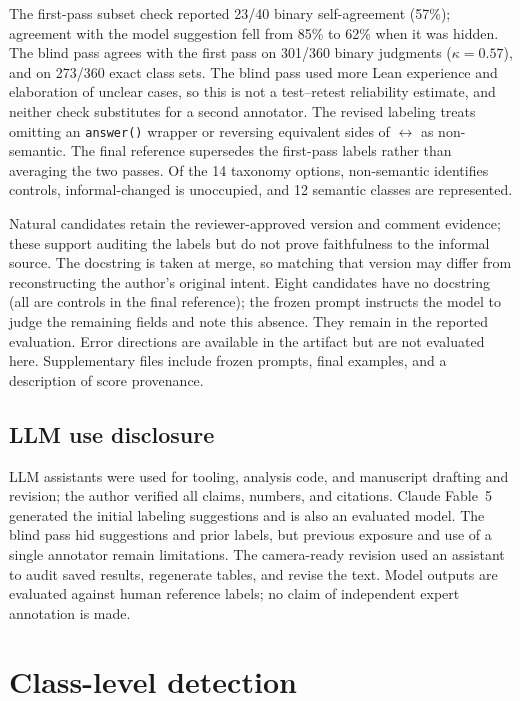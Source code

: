 \documentclass{article}
\begin{document}
The first-pass subset check reported 23/40 binary self-agreement (57\%);
agreement with the model suggestion fell from 85\% to 62\% when it was
hidden. The blind pass agrees with the first pass on 301/360 binary judgments
($\kappa=0.57$), and on 273/360 exact class sets. The blind pass used more
Lean experience and elaboration of unclear cases, so this is not a
test--retest reliability estimate, and neither check substitutes for a second
annotator. The revised labeling treats omitting an \texttt{answer()} wrapper
or reversing equivalent sides of $\leftrightarrow$ as non-semantic.
The final reference supersedes the first-pass labels rather than averaging
the two passes. Of the 14 taxonomy options, non-semantic identifies controls,
informal-changed is unoccupied, and 12 semantic classes are represented.

Natural candidates retain the reviewer-approved version and comment evidence;
these support auditing the labels but do not prove faithfulness to the
informal source. The docstring is taken at merge, so matching that version
may differ from reconstructing the author's original intent. Eight candidates have no docstring (all are controls in the final reference);
the frozen prompt instructs the model to judge the remaining fields and note
this absence. They remain in the reported evaluation. Error directions
are available in the artifact but are not evaluated here. Supplementary files
include frozen prompts, final examples, and a description of score provenance.

\subsection*{LLM use disclosure}
LLM assistants were used for tooling, analysis code, and manuscript drafting
and revision; the author verified all claims, numbers, and citations. Claude
Fable~5 generated the initial labeling suggestions and is also an evaluated
model. The blind pass hid suggestions and prior labels,
but previous exposure and use of a single annotator remain limitations.
The camera-ready revision used an assistant to audit saved results, regenerate
tables, and revise the text. Model outputs are evaluated against human
reference labels; no claim of independent expert annotation is made.

\clearpage
\section{Class-level detection}
\label{sec:classresults}
\begin{table}[h]\centering\small
{}
\caption{Correct-class detection counts. Row totals count reference examples.
For incomplete models ($\dagger$), found/answered is shown when the answered
count is below the row total; a dash denotes no answered examples.
Bold labels identify the Lean-semantics group (Section~\ref{sec:eval}). Small
classes are descriptive only.}
\label{tab:classrecall}
\end{table}
\end{document}
